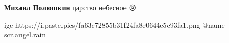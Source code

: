 \begin{multicols}{2}
\begin{itemize}
\begin{itemize} %
\textbf{Михаил Полюшкин} царство небесное 😢

\ifcmt
  igc https://i.paste.pics/fa63c72855b31f24fa8e0644e5c93fa1.png
	@name scr.angel.rain
\fi

\end{itemize} %



\end{itemize} %

\end{multicols} %


